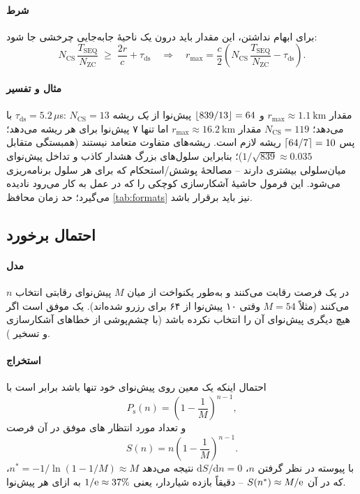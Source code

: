 \documentclass[11pt,a4paper]{article}
\begin{document}
\paragraph{شرط} برای ابهام نداشتن، این مقدار باید درون یک ناحیهٔ جابه‌جایی چرخشی جا شود:
\begin{equation}\label{eq:ncs}
  N_{\mathrm{CS}}\,\frac{T_{\mathrm{SEQ}}}{N_{\mathrm{ZC}}} \;\ge\; \frac{2r}{c} + \tau_{\mathrm{ds}}
  \quad\Longrightarrow\quad
  r_{\max} = \frac{c}{2}\left(N_{\mathrm{CS}}\,\frac{T_{\mathrm{SEQ}}}{N_{\mathrm{ZC}}} - \tau_{\mathrm{ds}}\right).
\end{equation}
\paragraph{مثال و تفسیر} با $\tau_{\mathrm{ds}} = 5.2\,\mu$s: $N_{\mathrm{CS}} = 13$ مقدار
$r_{\max} \approx \qty{1.1}{\kilo\metre}$ و $\left\lfloor 839/13\right\rfloor = 64$ پیش‌نوا از \emph{یک} ریشه می‌دهد؛
$N_{\mathrm{CS}} = 119$ مقدار $r_{\max}\approx\qty{16.2}{\kilo\metre}$ اما تنها ۷ پیش‌نوا برای هر ریشه می‌دهد؛ پس
$\left\lceil 64/7\right\rceil = 10$ ریشه لازم است. ریشه‌های متفاوت متعامد نیستند (همبستگی متقابل $1/\sqrt{839}\approx0.035$)؛
بنابراین سلول‌های بزرگ هشدار کاذب و تداخل پیش‌نوای میان‌سلولی بیشتری دارند -- مصالحهٔ پوشش/استحکام که برای هر
سلول برنامه‌ریزی می‌شود. این فرمول حاشیهٔ آشکارسازی کوچکی را که در عمل به کار می‌رود نادیده می‌گیرد؛ حد زمان
محافظ \cref{tab:formats} نیز باید برقرار باشد.

\subsection{احتمال برخورد}\label{sec:collision}
\paragraph{مدل} $n$  در یک فرصت  رقابت می‌کنند و به‌طور یکنواخت از میان $M$ پیش‌نوای رقابتی
انتخاب می‌کنند (مثلاً $M = 54$ وقتی ۱۰ پیش‌نوا از ۶۴ برای  رزرو شده‌اند). یک  موفق است اگر هیچ
 دیگری پیش‌نوای آن را انتخاب نکرده باشد (با چشم‌پوشی از خطاهای آشکارسازی و تسخیر ).
\paragraph{استخراج} احتمال اینکه یک  معین روی پیش‌نوای خود تنها باشد برابر است با
\begin{equation}\label{eq:psucc}
  P_\mathrm{s}(n) = \left(1-\frac{1}{M}\right)^{n-1},
\end{equation}
و تعداد مورد انتظار های موفق در آن فرصت
\begin{equation}\label{eq:nsucc}
  S(n) = n\left(1-\frac{1}{M}\right)^{n-1}.
\end{equation}
با پیوسته در نظر گرفتن $n$، $\mathrm{d}S/\mathrm{d}n = 0$ نتیجه می‌دهد $n^\ast = -1/\ln(1-1/M)\approx M$، که در آن
$S(n^\ast)\approx M/\mathrm{e}$ -- دقیقاً بازده  شیاردار، یعنی $1/\mathrm{e}\approx37\%$ به ازای هر پیش‌نوا.
\end{document}
